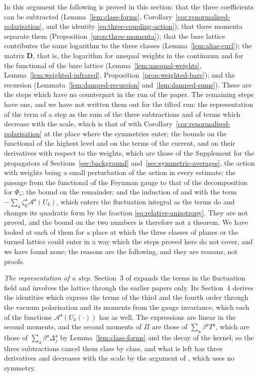 \documentclass[11pt]{preprint}
\numberwithin{equation}{section}
\theoremstyle{definition}
\theoremstyle{remark}
\theoremstyle{plain}
\begin{document}
In this argument the following is proved in this section: that the three coefficients can be subtracted (Lemma~\ref{lem:class-forms}, Corollary~\ref{cor:renormalised-polarisation}, and the identity \eqref{eq:three-coupling-action}); that three momenta separate them (Proposition~\ref{prop:three-momenta}); that the bare lattice contributes the same logarithm to the three classes (Lemma~\ref{lem:alias-curl}); the matrix $\mathbf D$, that is, the logarithm for unequal weights in the continuum and for the functional of the bare lattice (Lemma~\ref{lem:unequal-weights}, Lemma~\ref{lem:weighted-infrared}, Proposition~\ref{prop:weighted-bare}); and the recursion (Lemmata~\ref{lem:damped-recursion} and~\ref{lem:damped-sums}). These are the steps which have no counterpart in the run of the paper. The remaining steps have one, and we have not written them out for the tilted run: the representation of the term of a step as the sum of the three subtractions and of terms which decrease with the scale, which is that of \cite[Sects.~3--5]{BalabanRG1} with Corollary~\ref{cor:renormalised-polarisation} at the place where the symmetries enter; the bounds on the functional of the highest level and on the terms of the current, and on their derivatives with respect to the weights, which are those of the Supplement for the propagators of Sections~\ref{sec:background} and~\ref{sec:symmetric-averages}, the action with weights being a small perturbation of the action in every estimate; the passage from the functional of the Feynman gauge to that of the decomposition for $\Phi_r$; the bound on the remainder; and the induction of \cite{BalabanRG1} and \cite{BalabanCRE} with the term $-\sum_{\mathsf a}\zeta^{\mathsf a}_k\mathcal A^{\mathsf a}(U_k)$, which enters the fluctuation integral as the terms \cite[(4.38)]{BalabanRG1} do and changes its quadratic form by the fraction \eqref{eq:relative-anisotropy}. They are not proved, and the bound on the two numbers is therefore not a theorem. We have looked at each of them for a place at which the three classes of planes or the turned lattice could enter in a way which the steps proved here do not cover, and we have found none; the reasons are the following, and they are reasons, not proofs.

\emph{The representation of a step.} Section~3 of \cite{BalabanRG1} expands the terms in the fluctuation field and involves the lattice through the earlier papers only. Its Section~4 derives the identities which express the terms of the third and the fourth order through the vacuum polarisation and its moments from the gauge invariance, which each of the functions $\mathcal A^{\mathsf a}(U_k(\cdot))$ has as well. The expressions \cite[(4.42)--(4.44)]{BalabanRG1} are linear in the second moments, and the second moments of $\Pi$ are those of $\sum_{\mathsf a}\beta^{\mathsf a}T^{\mathsf a}$, which are those of $\sum_{\mathsf a}\beta^{\mathsf a}\Delta^{\mathsf a}_j$ by Lemma~\ref{lem:class-forms} and the decay of the kernel; so the three subtractions cancel them class by class, and what is left has three derivatives and decreases with the scale by the argument of \cite[p.~298]{BalabanRG1}, which uses no symmetry.
\end{document}
